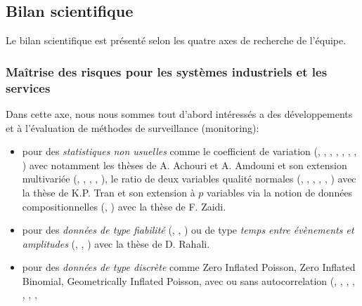 \subsection{Bilan scientifique}

Le bilan scientifique est présenté selon les quatre axes de recherche de l'équipe. 		

\subsubsection{Maîtrise des risques pour les systèmes industriels et les services}

Dans cette axe, nous nous sommes tout d'abord intéressés a des
développements et à l'évaluation de méthodes de surveillance
(monitoring):
\begin{itemize}
\item pour des \emph{statistiques non usuelles} comme le coefficient
  de variation (\cite{yeong:hal-01716541},
  \cite{amdouni:hal-01573597}, \cite{you:hal-01351488},
  \cite{teoh:hal-01381673}, \cite{amdouni:hal-01388503},
  \cite{castagliola:hal-01083082}, \cite{castagliola:hal-01202423},
  \cite{amdouni:hal-01202424}) avec notamment les thèses de A. Achouri
  et A. Amdouni et son extension multivariée
  (\cite{khatun:hal-02072237}, \cite{nguyen:hal-01885435},
  \cite{ginerbosch:hal-02283481}, \cite{khaw:hal-01895172},
  \cite{yeong:hal-01307037}), le ratio de deux variables qualité
  normales (\cite{tran:hal-01773342}, \cite{celano:hal-01264243},
  \cite{celano:hal-01272650}, \cite{tran:hal-01308072},
  \cite{tran:hal-01345854}, \cite{tran:hal-01396009}) avec la thèse de
  K.P. Tran et son extension à $p$ variables via la notion de données
  compositionnelles (\cite{zaidi:hal-02273060},
  \cite{tran:hal-01731361}) avec la thèse de F. Zaidi.
\item pour des \emph{données de type fiabilité}
  (\cite{haghighi:hal-02183425}, \cite{castagliola:hal-01204508},
  \cite{haghighi:hal-01264248}) ou de type \emph{temps entre
    évènements et amplitudes} (\cite{rahali:hal-02135093},
  \cite{qu:hal-01809531}, \cite{qu:hal-01895010}) avec la thèse de
  D. Rahali.
\item pour des \emph{données de type discrète} comme Zero Inflated
  Poisson, Zero Inflated Binomial, Geometrically Inflated Poisson,
  avec ou sans autocorrelation (\cite{rakitzis:hal-01718089},
  \cite{rakitzis:hal-01466793}, \cite{rakitzis:hal-01659129},
  \cite{bersimis:hal-01676808}, \cite{rakitzis:hal-01231367},
  \cite{rakitzis:hal-01331381}, \cite{rakitzis:hal-01345886},

\end{itemize}
